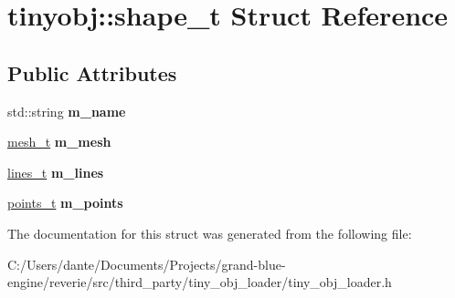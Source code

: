 \hypertarget{structtinyobj_1_1shape__t}{}\section{tinyobj\+::shape\+\_\+t Struct Reference}
\label{structtinyobj_1_1shape__t}
\subsection*{Public Attributes}
\begin{DoxyCompactItemize}
\item 
\mbox{\label{structtinyobj_1_1shape__t_a670543b0d2b87a51be453bf799d27b79}} 
std\+::string {\bfseries m\+\_\+name}
\item 
\mbox{\label{structtinyobj_1_1shape__t_a55fc15f39eb383cdeff8e154e126ba55}} 
\mbox{\hyperlink{structtinyobj_1_1mesh__t}{mesh\+\_\+t}} {\bfseries m\+\_\+mesh}
\item 
\mbox{\label{structtinyobj_1_1shape__t_abbf5d352b75ab68465bb4a1f8f47b8ae}} 
\mbox{\hyperlink{structtinyobj_1_1lines__t}{lines\+\_\+t}} {\bfseries m\+\_\+lines}
\item 
\mbox{\label{structtinyobj_1_1shape__t_a86fde21a542a61ffa467b8f0291ba821}} 
\mbox{\hyperlink{structtinyobj_1_1points__t}{points\+\_\+t}} {\bfseries m\+\_\+points}
\end{DoxyCompactItemize}


The documentation for this struct was generated from the following file\+:\begin{DoxyCompactItemize}
\item 
C\+:/\+Users/dante/\+Documents/\+Projects/grand-\/blue-\/engine/reverie/src/third\+\_\+party/tiny\+\_\+obj\+\_\+loader/tiny\+\_\+obj\+\_\+loader.\+h\end{DoxyCompactItemize}
